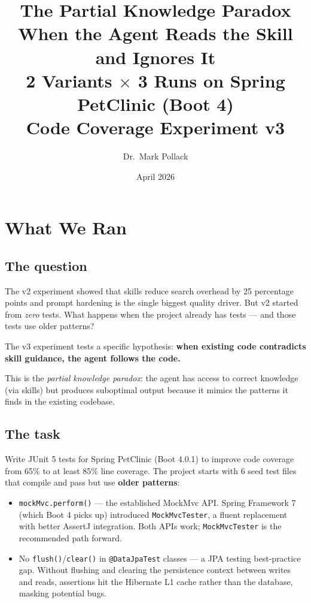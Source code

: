 \documentclass[11pt,a4paper]{article}
\title{\textbf{The Partial Knowledge Paradox}\\[0.4em]
\large When the Agent Reads the Skill and Ignores It\\
2 Variants $\times$ 3 Runs on Spring PetClinic (Boot 4)\\[0.6em]
\normalsize Code Coverage Experiment v3}
\author{Dr.\ Mark Pollack}
\date{April 2026}
\begin{document}
\maketitle
\tableofcontents
\newpage

\section{What We Ran}

\subsection*{The question}

The v2 experiment showed that skills reduce search overhead by 25 percentage points
and prompt hardening is the single biggest quality driver. But v2 started from
\emph{zero} tests. What happens when the project already has tests --- and those
tests use older patterns?

The v3 experiment tests a specific hypothesis:
\textbf{when existing code contradicts skill guidance, the agent follows the code.}

This is the \emph{partial knowledge paradox}: the agent has access to correct
knowledge (via skills) but produces suboptimal output because it mimics
the patterns it finds in the existing codebase.

\subsection*{The task}

Write JUnit 5 tests for Spring PetClinic (Boot 4.0.1) to improve code coverage
from 65\% to at least 85\% line coverage. The project starts with 6 seed test files
that compile and pass but use \textbf{older patterns}:

\begin{itemize}
  \item \texttt{mockMvc.perform()} --- the established MockMvc API.
    Spring Framework 7 (which Boot 4 picks up) introduced \texttt{MockMvcTester},
    a fluent replacement with better AssertJ integration.
    Both APIs work; \texttt{MockMvcTester} is the recommended path forward.
  \item No \texttt{flush()}/\texttt{clear()} in \texttt{@DataJpaTest} classes ---
    a JPA testing best-practice gap. Without flushing and clearing the persistence
    context between writes and reads, assertions hit the Hibernate L1 cache
    rather than the database, masking potential bugs.
\end{itemize}
\end{document}
